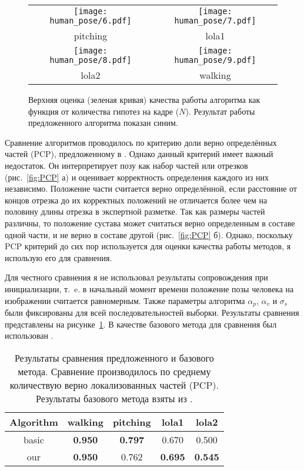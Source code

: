 \begin{figure*}[t]
	\begin{center}
		\begin{tabular}{cc}
			\texttt{[image: human\_pose/6.pdf]} & 			\texttt{[image: human\_pose/7.pdf]} \\
			pitching & lola1 \\
			\texttt{[image: human\_pose/8.pdf]} & \texttt{[image: human\_pose/9.pdf]} \\
			lola2 & walking
		\end{tabular}
		\caption{Верхняя оценка (зеленая кривая) качества работы алгоритма \cite{park2011n} как функция от количества гипотез на кадре ($N$). Результат работы предложенного алгоритма показан синим.} 
		\label{fig:upper_bound}
	\end{center}
\end{figure*}

Сравнение алгоритмов проводилось по критерию доли верно определённых частей (PCP), предложенному в  \cite{ferrari2008progressive}. Однако данный критерий имеет важный недостаток. Он интерпретирует позу как набор частей или отрезков (рис.~\ref{fig:PCP} а) и оценивает корректность определения каждого из них независимо. Положение части считается верно определённой, если расстояние от концов отрезка до их корректных положений не отличается более чем на половину длины отрезка в экспертной разметке. Так как размеры частей различны, то положение сустава может считаться верно определенным в составе одной части, и не верно в составе другой (рис.~\ref{fig:PCP} б). Однако, поскольку PCP критерий до сих пор используется для оценки качества работы методов, я использую его для сравнения.

Для честного сравнения я не использовал результаты сопровождения при инициализации, т.~e. в начальный момент времени положение позы человека на изображении считается равномерным. Также параметры алгоритма $\alpha_p$, $\alpha_v$ и $\sigma_s$ были фиксированы для всей последовательностей выборки. Результаты сравнения представлены на рисунке~\ref{tab:comparison}. В качестве базового метода для сравнения был использован \cite{park2011n}.

\begin{table}[h]
	\caption{Результаты сравнения предложенного и базового метода. Сравнение производилось по среднему количествую верно локализованных частей (PCP). Результаты базового метода взяты из \cite{park2011n}.}\label{tab:comparison} \centering
	\begin{tabular}{|c|c|c|c|c|}
		\hline
		Algorithm & walking & pitching & lola1 & lola2 \\
		\hline
		\hline
		basic & \textbf{0.950} & \textbf{0.797} & 0.670 & 0.500 \\
		\hline
		our & \textbf{0.950} & 0.762 & \textbf{0.695} & \textbf{0.545} \\
		\hline
	\end{tabular}
\end{table}

